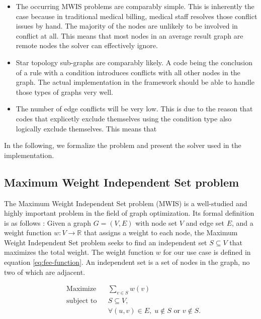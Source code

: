 \begin{itemize}
    \item The occurring MWIS problems are comparably simple.
    This is inherently the case because in traditional medical billing,
    medical staff resolves those conflict issues by hand.
    The majority of the nodes are unlikely to be involved in conflict at all.
    This means that most nodes in an average result graph are remote nodes the solver can effectively ignore.
    \item Star topology sub-graphs are comparably likely.
    A code
    being the conclusion of a rule with a condition  introduces conflicts with all other nodes in the graph.
    The actual implementation in the framework should be able to handle those types of graphs very well.
    \item The number of edge conflicts will be very low.
    This is due to the reason
    that codes that explicetly exclude themselves
    using the  condition type also logically exclude themselves.
    This means that
\end{itemize}

In the following, we formalize the problem and present the solver used in the implementation.

\subsection{Maximum Weight Independent Set problem}\label{subsec:maximum-weight-independent-set-problem}

The Maximum Weight Independent Set problem (MWIS)
is a well-studied and highly important problem in the field of graph optimization.
Its formal definition is as follows \cite{SAKAI2003313}:
Given a graph $G = (V, E)$ with node set $V$ and edge set $E$,
and a weight function $w: V \rightarrow \mathbb{R}$ that assigns a weight to each node,
the Maximum Weight Independent Set problem seeks
to find an independent set $S \subseteq V$ that maximizes the total weight.
The weight function $w$ for our use case is defined in equation \ref{eq:fee-function}.
An independent set is a set of nodes in the graph, no two of which are adjacent.

\begin{equation}
    \begin{aligned}
        & \text{Maximize}
        & & \sum_{v \in S} w(v) \\
        & \text{subject to}
        & & S \subseteq V, \\
        &&& \forall (u, v) \in E, \; u \notin S \text{ or } v \notin S.
    \end{aligned}\label{eq:mwis}
\end{equation}

